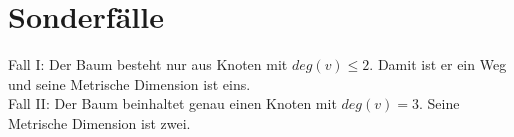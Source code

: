 \documentclass{article}
\begin{document}
\section{Sonderfälle}
Fall I: Der Baum besteht nur aus Knoten mit $deg(v) \leq 2$. Damit ist er ein Weg und seine Metrische Dimension ist eins.\\
Fall II: Der Baum beinhaltet genau einen Knoten mit $deg(v)=3$. Seine Metrische Dimension ist zwei.
\end{document}
